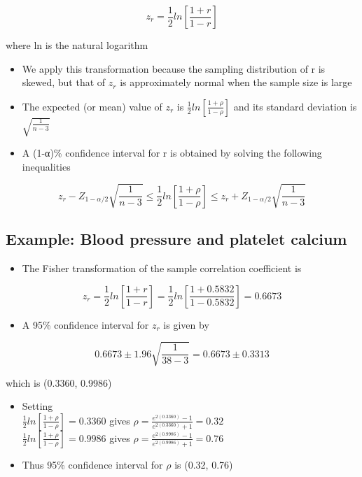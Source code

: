 \documentclass[
]{book}
\providecommand{\tightlist}{%
  \setlength{\itemsep}{0pt}\setlength{\parskip}{0pt}}
\begin{document}
\[z_r=\frac{1}{2}ln\left[\frac{1+r}{1-r}\right]\]

where ln is the natural logarithm

\begin{itemize}
\tightlist
\item
  We apply this transformation because the sampling distribution of r is skewed, but that of \(z_r\) is approximately normal when the sample size is large
\item
  The expected (or mean) value of \(z_r\) is \(\frac{1}{2}ln\left[\frac{1+\rho}{1-\rho}\right]\) and its standard deviation is \(\sqrt{\frac{1}{n-3}}\)
\item
  A (1-α)\% confidence interval for r is obtained by solving the following inequalities
\end{itemize}

\[z_r-Z_{1-\alpha/2}\sqrt{\frac{1}{n-3}}\leq\frac{1}{2}ln\left[\frac{1+\rho}{1-\rho}\right]\leq z_r+Z_{1-\alpha/2}\sqrt{\frac{1}{n-3}}\]

\hypertarget{example-blood-pressure-and-platelet-calcium-1}{%
\subsection{Example: Blood pressure and platelet calcium}\label{example-blood-pressure-and-platelet-calcium-1}}

\begin{itemize}
\tightlist
\item
  The Fisher transformation of the sample correlation coefficient is
\end{itemize}

\[z_r=\frac{1}{2}ln\left[\frac{1+r}{1-r}\right]=\frac{1}{2}ln\left[\frac{1+0.5832}{1-0.5832}\right]=0.6673\]

\begin{itemize}
\tightlist
\item
  A 95\% confidence interval for \(z_r\) is given by
\end{itemize}

\[0.6673 \pm 1.96\sqrt{\frac{1}{38-3}}=0.6673\pm0.3313\]

which is (0.3360, 0.9986)

\begin{itemize}
\item
  Setting\\
  \(\frac{1}{2}ln\left[\frac{1+\rho}{1-\rho}\right]=0.3360\) gives \(\rho=\frac{e^{2(0.3360)}-1}{e^{2(0.3360)}+1}=0.32\)\\
  \(\frac{1}{2}ln\left[\frac{1+\rho}{1-\rho}\right]=0.9986\) gives \(\rho=\frac{e^{2(0.9986)}-1}{e^{2(0.9986)}+1}=0.76\)
\item
  Thus 95\% confidence interval for \(\rho\) is (0.32, 0.76)
\end{itemize}
\end{document}
